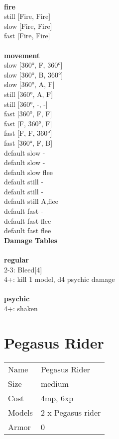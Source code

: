 \ \\ {\bf fire } \\
still [Fire, Fire] \\
slow [Fire, Fire] \\
fast [Fire, Fire] \\
\ \\ {\bf movement } \\
slow [360°, F, 360°] \\
slow [360°, B, 360°] \\
slow [360°, A, F] \\
still [360°, A, F] \\
still [360°, -, -] \\
fast [360°, F, F] \\
fast [F, 360°, F] \\
fast [F, F, 360°] \\
fast [360°, F, B] \\
default slow - \\
default slow - \\
default slow flee \\
default still - \\
default still - \\
default still A,flee \\
default fast - \\
default fast flee \\
default fast flee \\


{\bf Damage Tables} \\
\ \\ {\bf regular } \\
2-3: Bleed[4] \\
4+: kill 1 model, d4 psychic damage \\
\ \\ {\bf psychic } \\
4+: shaken \\










\pagebreak\pagebreak

\section{ Pegasus Rider }

\begin{tabular}{ll}
  Name & Pegasus Rider \\
  Size & medium\\
  Cost & 4mp, 6xp\\
  Models & 2 x Pegasus rider\\
  Armor & 0\\
\end{tabular}

